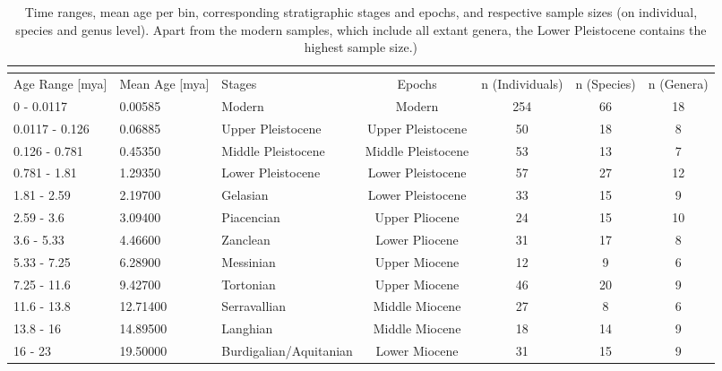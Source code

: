 \begin{landscape}\label{data}
	\begin{longtable}[]{@{}lllcccc@{}}
		\caption[Sample sizes per time bins]{Time ranges, mean age per bin, corresponding stratigraphic stages and epochs, and respective sample sizes (on individual, species and genus level). Apart from the modern samples, which include all extant genera, the Lower Pleistocene contains the highest sample size.)}
		\label{tab:bins}\tabularnewline
		\toprule
		Age Range [mya] & Mean Age [mya] & Stages & Epochs & n (Individuals) & n (Species) & n (Genera)\tabularnewline
		\midrule
		\endhead
		0 - 0.0117 & 0.00585 & Modern & Modern & 254 & 66 & 18\tabularnewline
		0.0117 - 0.126 & 0.06885 & Upper Pleistocene & Upper Pleistocene & 50
		& 18 & 8\tabularnewline
		0.126 - 0.781 & 0.45350 & Middle Pleistocene & Middle Pleistocene & 53
		& 13 & 7\tabularnewline
		0.781 - 1.81 & 1.29350 & Lower Pleistocene & Lower Pleistocene & 57 &
		27 & 12\tabularnewline
		1.81 - 2.59 & 2.19700 & Gelasian & Lower Pleistocene & 33 & 15 &
		9\tabularnewline
		2.59 - 3.6 & 3.09400 & Piacencian & Upper Pliocene & 24 & 15 &
		10\tabularnewline
		3.6 - 5.33 & 4.46600 & Zanclean & Lower Pliocene & 31 & 17 &
		8\tabularnewline
		5.33 - 7.25 & 6.28900 & Messinian & Upper Miocene & 12 & 9 &
		6\tabularnewline
		7.25 - 11.6 & 9.42700 & Tortonian & Upper Miocene & 46 & 20 &
		9\tabularnewline
		11.6 - 13.8 & 12.71400 & Serravallian & Middle Miocene & 27 & 8 &
		6\tabularnewline
		13.8 - 16 & 14.89500 & Langhian & Middle Miocene & 18 & 14 &
		9\tabularnewline
		16 - 23 & 19.50000 & Burdigalian/Aquitanian & Lower Miocene & 31 & 15 & 9\tabularnewline
		\bottomrule
	\end{longtable}
\end{landscape}






\FloatBarrier
